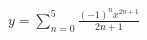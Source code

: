 \documentclass[preview]{standalone}
\begin{document}
\begin{align*}
y = \sum_{n=0}^{5} \frac{(-1)^n x^{2n+1}}{2n+1}
\end{align*}
\end{document}
